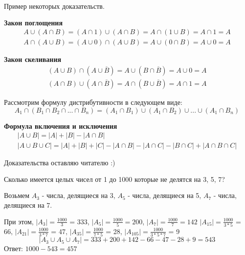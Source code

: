 Пример некоторых доказательств.

\textbf{Закон поглощения}
\begin{gather}
    A \cup (A \cap B) = (A \cap 1) \cup (A \cap B) = A \cap (1 \cup B) = A \cap 1 = A \\
    A \cap (A \cup B) = (A \cup 0) \cap (A \cup B) = A \cup (0 \cap B) = A \cup 0 = A
\end{gather}

\textbf{Закон скеливания}
\begin{gather}
    (A \cup B) \cap (A \cup \overline B) = A \cup (B \cap \overline B) = A \cup 0 = A \\
    (A \cap B) \cup (A \cap \overline B) = A \cap (B \cup \overline B) = A \cap 1 = A
\end{gather}

Рассмотрим формулу дистрибутивности в следующем виде:
\begin{equation}
    A_1 \cap (B_1 \cap B_2 \cap ... \cap B_n) = (A_1 \cap B_1) \cup (A_1 \cap B_2) \cup ... \cup (A_1 \cap B_n)
\end{equation}

\textbf{Формула включения и исключения}
\begin{gather}
    |A \cup B| = |A| + |B| - |A \cap B| \\
    |A \cup B \cup C| = |A| + |B| + |C| - |A \cap B| - |A \cap C| - |B \cap C| + |A \cap B \cap C|
\end{gather}

Доказательства оставляю читателю :)

\begin{task}
    Сколько имеется целых чисел от 1 до 1000 которые не делятся на 3, 5, 7?

    \begin{solution}
        Возьмем $A_3$ - числа, делящиеся на 3, $A_5$ - числа, делящиеся на 5,
        $A_7$ - числа, делящиеся на 7.
    
        При этом, $|A_3| = \frac{1000}{3}$ = 333, $|A_5| = \frac{1000}{5} = 200$, $|A_7| = \frac{1000}{7} = 142$
        $|A_{15}| = \frac{1000}{3*5}$ = 66, $|A_{21}| = \frac{1000}{3*7}$ = 47, $|A_{35}| = \frac{1000}{7 * 5}$ = 28,
        $|A_{105}| = \frac{1000}{3*5*7}$ = 9
        \begin{equation*}
            |A_3 \cup A_5 \cup A_7| = 333 + 200 + 142 - 66 - 47 - 28 + 9 = 543
        \end{equation*}
        Ответ: $1000 - 543 = 457$
    \end{solution}
\end{task}
